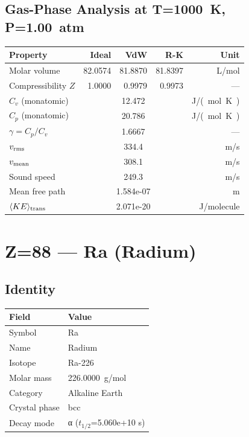\documentclass[11pt,a4paper]{article}
\begin{document}
\subsection{Gas-Phase Analysis at T=\SI{1000}{K}, P=\SI{1.00}{atm}}
\begin{tabular}{lrrrr}
  \toprule
  Property & Ideal & VdW & R-K & Unit \\
  \midrule
  Molar volume & 82.0574 & 81.8870 & 81.8397 & \si{L/mol} \\
  Compressibility $Z$ & 1.0000 & 0.9979 & 0.9973 & --- \\
  \midrule
  $C_v$ (monatomic) & \multicolumn{3}{c}{12.472} & \si{J/(mol.K)} \\
  $C_p$ (monatomic) & \multicolumn{3}{c}{20.786} & \si{J/(mol.K)} \\
  $\gamma = C_p/C_v$ & \multicolumn{3}{c}{1.6667} & --- \\
  $v_{\rm rms}$ & \multicolumn{3}{c}{334.4} & \si{m/s} \\
  $v_{\rm mean}$ & \multicolumn{3}{c}{308.1} & \si{m/s} \\
  Sound speed & \multicolumn{3}{c}{249.3} & \si{m/s} \\
  Mean free path & \multicolumn{3}{c}{1.584e-07} & \si{m} \\
  $\langle KE \rangle_{\rm trans}$ & \multicolumn{3}{c}{2.071e-20} & \si{J/molecule} \\
  \bottomrule
\end{tabular}

\newpage

\section{Z=88 --- Ra (Radium)}
\label{sec:Z88}

\subsection{Identity}
\begin{tabular}{ll}
  \toprule
  Field & Value \\
  \midrule
  Symbol & Ra \\
  Name & Radium \\
  Isotope & Ra-226 \\
  Molar mass & \SI{226.0000}{g/mol} \\
  Category & Alkaline Earth \\
  Crystal phase & bcc \\
  Decay mode & α ($t_{1/2}$=5.060e+10 s) \\
  \bottomrule
\end{tabular}
\end{document}
